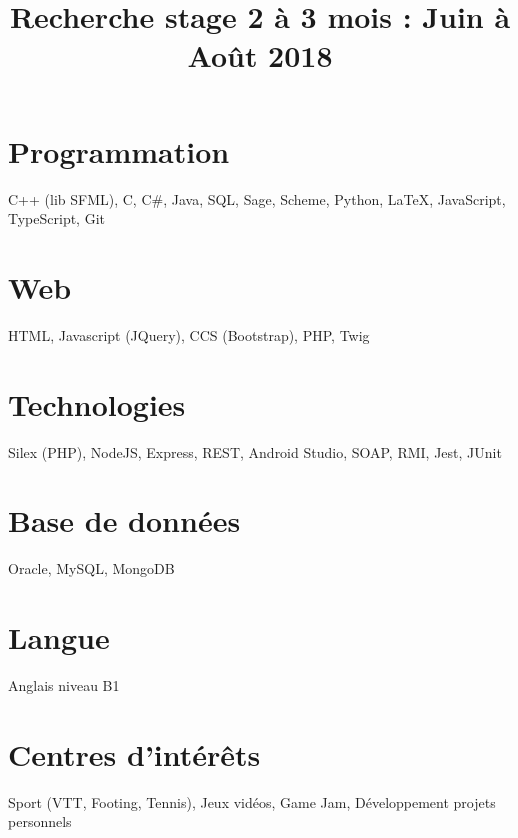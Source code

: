\documentclass[11pt,a4paper,sans]{moderncv} %
\title{Recherche stage 2 à 3 mois  : Juin à Août 2018}
\begin{document}
\makecvtitle %
\vspace{-1cm} 


\begin{minipage}[t]{0.2\linewidth}
\setlength{\maincolumnwidth}{\linewidth-\leftskip-\rightskip}
\setlength{\hintscolumnwidth}{0cm}

\section*{Programmation}
\begin{flushleft}
C++ (lib SFML), C, C\#, Java, SQL, Sage, Scheme, Python, \LaTeX, JavaScript, TypeScript, Git
\end{flushleft}

\section*{Web}
\begin{flushleft}
HTML, Javascript (JQuery), CCS (Bootstrap), PHP, Twig
\end{flushleft}

\section*{Technologies}
\begin{flushleft}
Silex (PHP), NodeJS, Express, REST, Android Studio, SOAP, RMI, Jest, JUnit
\end{flushleft}

\section*{Base de données}
\begin{flushleft}
Oracle, MySQL, MongoDB
\end{flushleft}

\section*{Langue}
Anglais niveau B1

\section*{Centres d'intérêts}
\begin{flushleft}
Sport (VTT, Footing, Tennis), Jeux vidéos, Game Jam, Développement projets personnels
\end{flushleft}
\end{minipage}
\end{document}
